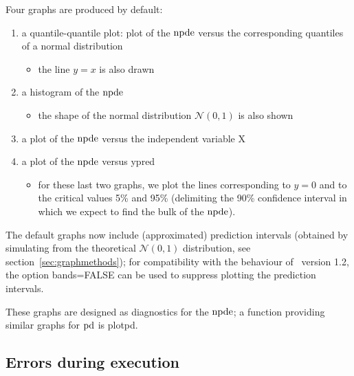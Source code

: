 \hskip 18pt Four graphs are produced by default: \begin{enumerate} \item a quantile-quantile plot: plot of the 
${\rm npde}$ versus the corresponding quantiles of a normal distribution \begin{itemize} \item the line $y=x$ is also 
drawn \end{itemize} \item a histogram of the ${\rm npde}$ \begin{itemize} \item the shape of the normal distribution 
$\mathcal{N}(0,1)$ is also shown \end{itemize} \item a plot of the ${\rm npde}$ versus the independent variable X \item 
a plot of the ${\rm npde}$ versus ypred \begin{itemize} \item for these last two graphs, we plot the lines corresponding 
to $y=0$ and to the critical values 5\% and 95\% (delimiting the 90\% confidence interval in which we expect to 
find the bulk of the ${\rm npde}$). \end{itemize}   \end{enumerate} The default graphs now include (approximated) 
prediction intervals (obtained by simulating from the theoretical $\mathcal{N}(0,1)$ distribution, see 
section~\ref{sec:graphmethods}); for compatibility with the behaviour of \npde~version 1.2, the option {\sf 
bands=FALSE} can be used to suppress plotting the prediction intervals.

These graphs are designed as diagnostics for the ${\rm npde}$; a function providing similar graphs for ${\rm pd}$ is {\sf 
plotpd}.

\subsection{Errors during execution}

